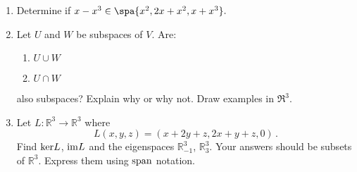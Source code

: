 


\begin{enumerate}


\item \label{subspaces_spanning_sets_polynolmial_span} {Determine} if  
$x-x^3 \in \spa\{ x^2, 2x+x^2, x+x^3 \}.$


\item\label{UandV} \hypertarget{intersections}{Let} $U$ and $W$ be subspaces of $V$.  Are:
\label{UcapV}
\begin{enumerate}
\item $U\cup W$
\item $U\cap W$
\end{enumerate}
also subspaces?  Explain why or why not.  Draw examples in $\Re^3$.



\item Let $L:{\mathbb R}^3\to {\mathbb R}^3$ where $$L(x,y,z)=(x+2y+z,2x+y+z,0)\, .$$ 
Find ${\rm ker} L$, ${\rm im} L$ and the eigenspaces ${\mathbb R}^3_{-1}$, ${\mathbb R}^3_{3}$. Your answers should be subsets of ${\mathbb R}^3$. Express them using  ${\rm span}$ notation.

\end{enumerate}

